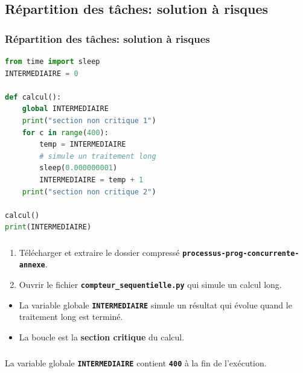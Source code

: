 \documentclass[svgnames,11pt]{beamer}
\begin{document}
\subsection{Répartition des tâches: solution à risques}
\begin{frame}[fragile]
    \frametitle{Répartition des tâches: solution à risques}

    \begin{center}
        \begin{lstlisting}[language=Python , basicstyle=\ttfamily\small, xleftmargin=1em, xrightmargin=0em]
from time import sleep
INTERMEDIAIRE = 0

def calcul():
    global INTERMEDIAIRE
    print("section non critique 1")
    for c in range(400):
        temp = INTERMEDIAIRE
        # simule un traitement long
        sleep(0.000000001)        
        INTERMEDIAIRE = temp + 1
    print("section non critique 2")

calcul()
print(INTERMEDIAIRE)
\end{lstlisting}
        \label{simul1}
    \end{center}

\end{frame}
\begin{frame}
    \frametitle{}

    \begin{activite}
        \begin{enumerate}
            \item Télécharger et extraire le dossier compressé \textbf{\texttt{processus-prog-concurrente-annexe}}.
            \item Ouvrir le fichier \textbf{\texttt{compteur\_sequentielle.py}} qui simule un calcul long.
        \end{enumerate}
    \end{activite}
    \begin{aretenir}[Commentaire]
        \begin{itemize}
            \item La variable globale \textbf{\texttt{INTERMEDIAIRE}} simule un résultat qui évolue quand le traitement long est terminé.
            \item La boucle est la \textbf{section critique} du calcul.
        \end{itemize}
    \end{aretenir}
\end{frame}
\begin{frame}
    \frametitle{}

    \begin{center}
        La variable globale \textbf{\texttt{INTERMEDIAIRE}} contient \textbf{\texttt{400}} à la fin de l'exécution.
    \end{center}

\end{frame}
\end{document}

